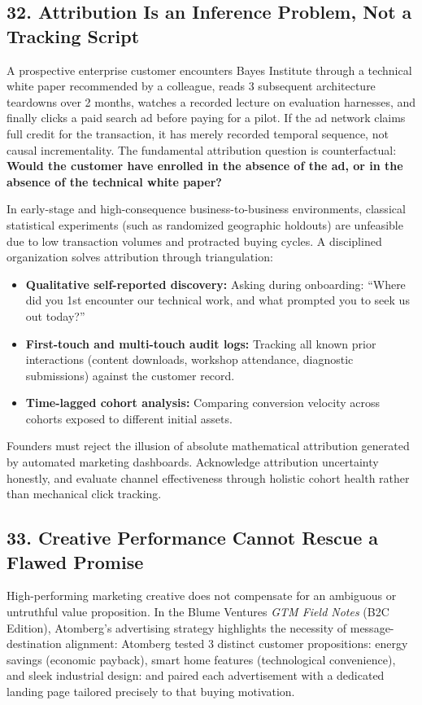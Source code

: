 \subsection*{32. Attribution Is an Inference Problem, Not a Tracking Script}

A prospective enterprise customer encounters Bayes Institute through a technical white paper recommended by a colleague, reads 3 subsequent architecture teardowns over 2 months, watches a recorded lecture on evaluation harnesses, and finally clicks a paid search ad before paying for a pilot. If the ad network claims full credit for the transaction, it has merely recorded temporal sequence, not causal incrementality. The fundamental attribution question is counterfactual: \textbf{Would the customer have enrolled in the absence of the ad, or in the absence of the technical white paper?}

In early-stage and high-consequence business-to-business environments, classical statistical experiments (such as randomized geographic holdouts) are unfeasible due to low transaction volumes and protracted buying cycles. A disciplined organization solves attribution through triangulation:
\begin{itemize}[leftmargin=*,itemsep=1pt]
  \item \textbf{Qualitative self-reported discovery:} Asking during onboarding: ``Where did you 1st encounter our technical work, and what prompted you to seek us out today?''
  \item \textbf{First-touch and multi-touch audit logs:} Tracking all known prior interactions (content downloads, workshop attendance, diagnostic submissions) against the customer record.
  \item \textbf{Time-lagged cohort analysis:} Comparing conversion velocity across cohorts exposed to different initial assets.
\end{itemize}

Founders must reject the illusion of absolute mathematical attribution generated by automated marketing dashboards. Acknowledge attribution uncertainty honestly, and evaluate channel effectiveness through holistic cohort health rather than mechanical click tracking.

\subsection*{33. Creative Performance Cannot Rescue a Flawed Promise}

High-performing marketing creative does not compensate for an ambiguous or untruthful value proposition. In the Blume Ventures \textit{GTM Field Notes} (B2C Edition), Atomberg's advertising strategy highlights the necessity of message-destination alignment: Atomberg tested 3 distinct customer propositions: energy savings (economic payback), smart home features (technological convenience), and sleek industrial design: and paired each advertisement with a dedicated landing page tailored precisely to that buying motivation.

